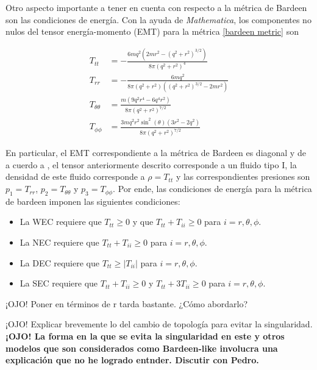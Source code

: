 \documentclass[prb,aps,preprintnumbers,amsmath,amssymb]{article}
\numberwithin{equation}{section}
\begin{document}
Otro aspecto importante a tener en cuenta con respecto a la métrica de Bardeen son las condiciones de energía. Con la ayuda de \textit{Mathematica}, los componentes no nulos del tensor energía-momento (EMT) para la métrica \eqref{bardeen metric} son

\begin{equation}
\begin{split}
T_{tt} &= -\frac{6 m q^2 \left(2 m r^2-\left(q^2+r^2\right)^{3/2}\right)}{8 \pi \left(q^2+r^2\right)^4}\\
T_{rr} &= -\frac{6 m q^2}{8 \pi \left(q^2+r^2\right) \left(\left(q^2+r^2\right)^{3/2}-2 m r^2\right)}\\
T_{\theta \theta} &= \frac{m \left(9 q^2 r^4-6 q^4 r^2\right)}{8 \pi \left(q^2+r^2\right)^{7/2}}\\
T_{\phi \phi} &= \frac{3 m q^2 r^2 \sin ^2(\theta ) \left(3 r^2-2 q^2\right)}{8 \pi \left(q^2+r^2\right)^{7/2}}
\end{split}
\end{equation}

En particular, el EMT correspondiente a la métrica de Bardeen es diagonal y de a cuerdo a \cite{hawking}, el tensor anteriormente descrito corresponde a un fluido tipo I, la densidad de este fluido corresponde a $\rho = T_{tt}$ y las correspondientes presiones son $p_{1} = T_{rr}$, $p_{2} = T_{\theta \theta}$ y $p_{3} = T_{\phi \phi}$. Por ende, las condiciones de energía para la métrica de bardeen imponen las siguientes condiciones:

\begin{itemize}
\item La WEC requiere que $T_{tt} \geq 0$ y que $T_{tt} + T_{ii} \geq 0$ para $i = r,\theta,\phi$.
\item La NEC requiere que $T_{tt} + T_{ii} \geq 0$ para $i = r,\theta,\phi$.
\item La DEC requiere que $T_{tt} \geq |T_{ii}|$ para $i = r,\theta,\phi$.
\item La SEC requiere que $T_{tt} + T_{ii} \geq 0$ y $T_{tt} + 3T_{ii} \geq 0$ para $i = r,\theta,\phi$.
\end{itemize}

¡OJO! Poner en términos de r tarda bastante. ¿Cómo abordarlo?

¡OJO! Explicar brevemente lo del cambio de topología para evitar la singularidad.\\

\textbf{¡OJO! La forma en la que se evita la singularidad en este y otros modelos que son considerados como Bardeen-like involucra una explicación que no he logrado entnder. Discutir con Pedro.}\\
\end{document}
